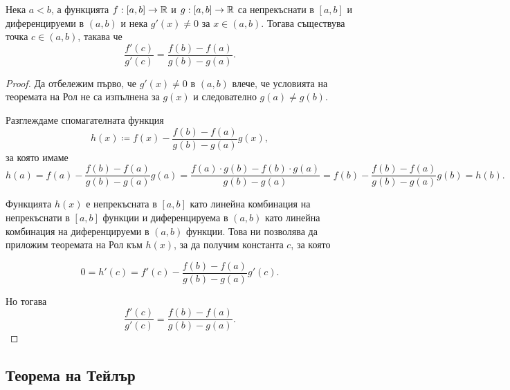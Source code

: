 \documentclass[numbers=endperiod, DIV=15, bibliography=totocnumbered]{scrartcl}
\begin{document}
\begin{theorem}
  Нека $a < b$, а функцията $f: [a, b] \to \mathbb{R}$ и $g: [a, b] \to \mathbb{R}$ са непрекъснати в $[a, b]$ и диференцируеми в $(a, b)$ и нека $g'(x) \neq 0$ за $x \in (a, b)$. Тогава съществува точка $c \in (a, b)$, такава че
  \begin{displaymath}
    \frac {f'(c)} {g'(c)} = \frac {f(b) - f(a)} {g(b) - g(a)}.
  \end{displaymath}
\end{theorem}
\begin{proof}
  Да отбележим първо, че $g'(x) \neq 0$ в $(a, b)$ влече, че условията на теоремата на Рол не са изпълнена за $g(x)$ и следователно $g(a) \neq g(b)$.

  Разглеждаме спомагателната функция
  \begin{displaymath}
    h(x) \coloneqq f(x) - \frac {f(b) - f(a)} {g(b) - g(a)} g(x),
  \end{displaymath}
  за която имаме
  \begin{displaymath}
    h(a)
    =
    f(a) - \frac {f(b) - f(a)} {g(b) - g(a)} g(a)
    =
    \frac {f(a) \cdot g(b) - f(b) \cdot g(a)} {g(b)-g(a)}
    =
    f(b) - \frac {f(b) - f(a)} {g(b) - g(a)} g(b)
    =
    h(b).
  \end{displaymath}

  Функцията $h(x)$ е непрекъсната в $[a, b]$ като линейна комбинация на непрекъснати в $[a, b]$ функции и диференцируема в $(a, b)$ като линейна комбинация на диференцируеми в $(a, b)$ функции. Това ни позволява да приложим теоремата на Рол към $h(x)$, за да получим константа $c$, за която

  \begin{displaymath}
    0 = h'(c) = f'(c) - \frac {f(b) - f(a)} {g(b) - g(a)} g'(c).
  \end{displaymath}

  Но тогава
  \begin{displaymath}
    \frac {f'(c)} {g'(c)} = \frac {f(b) - f(a)} {g(b) - g(a)}.
  \end{displaymath}
\end{proof}

\subsection{Теорема на Тейлър}
\end{document}
